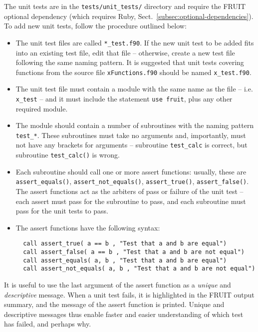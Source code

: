 The unit tests are in the \texttt{tests/unit\_tests/} directory and
require the FRUIT optional dependency (which requires Ruby,
Sect.~\ref{subsec:optional-dependencies}). To add new unit tests,
follow the procedure outlined below:

\begin{itemize}
\item The unit test files are called \texttt{*\_test.f90}. If the new
  unit test to be added fits into an existing test file, edit that
  file -- otherwise, create a new test file following the same naming
  pattern. It is suggested that unit tests covering functions from the
  source file \texttt{xFunctions.f90} should be named
  \texttt{x\_test.f90}.
\item The unit test file must contain a module with the same name as
  the file -- i.e. \texttt{x\_test} -- and it must include the
  statement \verb|use fruit|, plus any other required module.
\item The module should contain a number of subroutines with the
  naming pattern \texttt{test\_*}. These subroutines must take no
  arguments and, importantly, must not have any brackets for arguments
  -- subroutine \texttt{test\_calc} is correct, but subroutine
  \texttt{test\_calc()} is wrong.
\item Each subroutine should call one or more assert functions:
  usually, these are \texttt{assert\_equals()}, \texttt{assert\_not\_equals()},
  \texttt{assert\_true()}, \texttt{assert\_false()}. The assert functions
  act as the arbiters of pass or failure of the unit test -- each
  assert must pass for the subroutine to pass, and each subroutine
  must pass for the unit tests to pass.
\item The assert functions have the following syntax:
  \begin{verbatim}
  call assert_true( a == b , "Test that a and b are equal")
  call assert_false( a == b , "Test that a and b are not equal")
  call assert_equals( a, b , "Test that a and b are equal")
  call assert_not_equals( a, b , "Test that a and b are not equal")
  \end{verbatim}
\end{itemize}

It is useful to use the last argument of the assert function as a
\emph{unique} and \emph{descriptive} message. When a unit test fails,
it is highlighted in the FRUIT output summary, and the message of the
assert function is printed. Unique and descriptive messages thus
enable faster and easier understanding of which test has failed, and
perhaps why.

